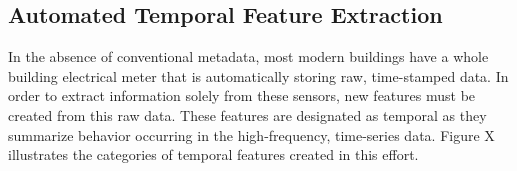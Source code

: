 \subsection{Automated Temporal Feature Extraction}

In the absence of conventional metadata, most modern buildings have a whole building electrical meter that is automatically storing raw, time-stamped data. In order to extract information solely from these sensors, new features must be created from this raw data.  These features are designated as temporal as they summarize behavior occurring in the high-frequency, time-series data. Figure X illustrates the categories of temporal features created in this effort.

